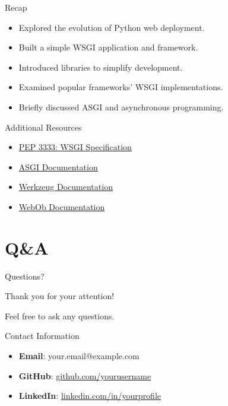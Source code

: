 \documentclass{beamer}
\begin{document}
\begin{frame}{Recap}
    \begin{itemize}
        \item Explored the evolution of Python web deployment.
        \item Built a simple WSGI application and framework.
        \item Introduced libraries to simplify development.
        \item Examined popular frameworks' WSGI implementations.
        \item Briefly discussed ASGI and asynchronous programming.
    \end{itemize}
\end{frame}

\begin{frame}{Additional Resources}
    \begin{itemize}
        \item \href{https://www.python.org/dev/peps/pep-3333/}{PEP 3333: WSGI Specification}
        \item \href{https://asgi.readthedocs.io/en/latest/}{ASGI Documentation}
        \item \href{https://werkzeug.palletsprojects.com/}{Werkzeug Documentation}
        \item \href{https://docs.pylonsproject.org/projects/webob/en/stable/}{WebOb Documentation}
    \end{itemize}
\end{frame}

\section{Q\&A}

\begin{frame}{Questions?}
    \begin{center}
        \Large Thank you for your attention!
    \end{center}
    \begin{center}
        \normalsize Feel free to ask any questions.
    \end{center}
\end{frame}

\begin{frame}{Contact Information}
    \begin{itemize}
        \item \textbf{Email}: your.email@example.com
        \item \textbf{GitHub}: \href{https://github.com/yourusername}{github.com/yourusername}
        \item \textbf{LinkedIn}: \href{https://www.linkedin.com/in/yourprofile/}{linkedin.com/in/yourprofile}
    \end{itemize}
\end{frame}
\end{document}
